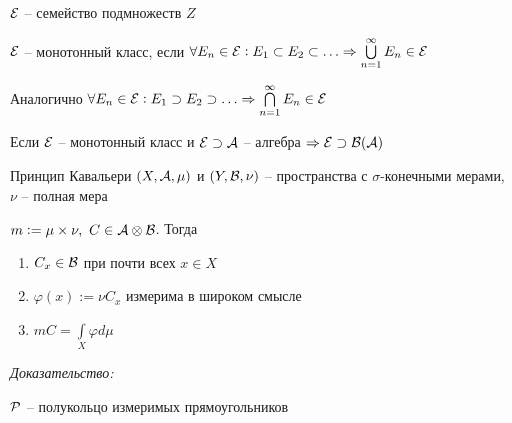 \documentclass[12pt]{article}
\begin{document}
\begin{defin}{}
    $\E$ -- семейство подмножеств $Z$

    $\E$ -- монотонный класс, если $\forall E_n \in \E : E_1 \subset E_2 \subset \ldots \Rightarrow \bigcup\limits_{n = 1}^\infty E_n \in \E$

    Аналогично $\forall E_n \in \E : E_1 \supset E_2 \supset \ldots \Rightarrow \bigcap\limits_{n = 1}^\infty E_n \in \E$
\end{defin}

\begin{theo}{}
    Если $\E$ -- монотонный класс и $\E \supset \A$ -- алгебра $\Rightarrow \E \supset \B(\A)$
\end{theo}

\begin{theo}{Принцип Кавальери}
    $(X, \A, \mu)$ и $(Y, \B, \nu)$ -- пространства с $\sigma$-конечными мерами, $\nu$ -- полная мера 

    $m := \mu \times \nu,\ C \in \A \otimes \B$. Тогда 

    \begin{enumerate}
        \item $C_x \in \B$ при почти всех $x \in X$
        \item $\varphi(x) := \nu C_x$ измерима в широком смысле 
        \item $mC = \int\limits_X \varphi d\mu$
    \end{enumerate}
\end{theo}

\textit{Доказательство:}

$\P$ -- полукольцо измеримых прямоугольников 
\end{document}
